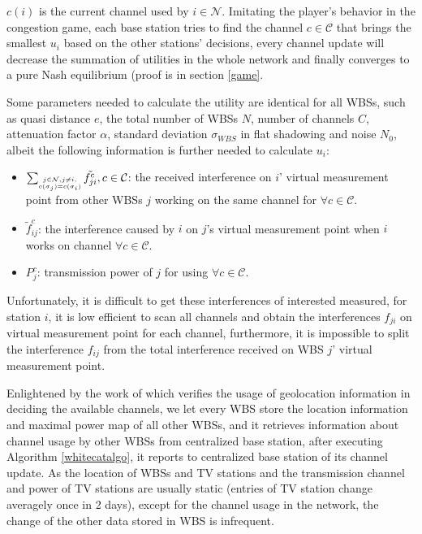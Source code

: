 $c(i)$ is the current channel used by $i\in \mathcal{N}$. Imitating the player's behavior in the congestion game, each base station tries to find the channel $c\in \mathcal{C}$ that brings the smallest $u_i$ based on the other stations' decisions, every channel update will decrease the summation of utilities in the whole network and finally converges to a pure Nash equilibrium (proof is in section \ref{game}.


Some parameters needed to calculate the utility are identical for all WBSs, such as quasi distance $e$, the total number of WBSs $N$, number of channels $C$, attenuation factor $\alpha$, standard deviation $\sigma_{WBS}$ in flat shadowing and noise $N_0$, albeit the following information is further needed to calculate $u_i$: 
	\begin{itemize} %
	\item $\sum_{\tiny\substack{j\in \mathcal{N}, j\ne i,\\ c(\sigma_j)=c(\sigma_i)}}\tilde{f_{ji}^c}, c\in \mathcal{C}$: the received interference on $i$' virtual measurement point from other WBSs $j$ working on the same channel for $\forall c\in \mathcal{C}$.
	\item $\tilde f_{ij}^c$: the interference caused by $i$ on $j$'s virtual measurement point when $i$ works on channel $\forall c\in \mathcal{C}$.
	\item $P_j^c$: transmission power of $j$ for using $\forall c\in \mathcal{C}$.
	\end{itemize}
Unfortunately, it is difficult to get these interferences of interested measured, for station $i$, it is low efficient to scan all channels and obtain the interferences $f_{ji}$ on virtual measurement point for each channel, furthermore, it is impossible to split the interference $f_{ij}$ from the total interference received on WBS $j$' virtual measurement point. 

Enlightened by the work of \cite{SenseLess2011} which verifies the usage of geolocation information in deciding the available channels, we let every WBS store the location information and maximal power map of all other WBSs, and it retrieves information about channel usage by other WBSs from centralized base station, after executing Algorithm \ref{whitecatalgo}, it reports to centralized base station of its channel update. As the location of WBSs and TV stations and the transmission channel and power of TV stations are usually static (entries of TV station change averagely once in 2 days\cite{SenseLess2011}), except for the channel usage in the network, the change of the other data stored in WBS is infrequent. 


